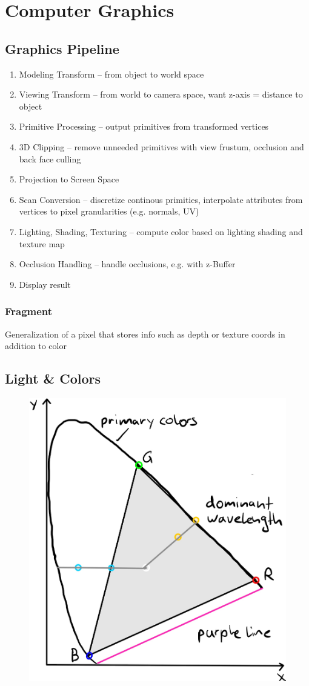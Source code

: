 \documentclass[a4paper,10pt]{article}
\begin{document}
\section{Computer Graphics}
\subsection{Graphics Pipeline}
\begin{enumerate}
    \item Modeling Transform -- from object to world space
    \item Viewing Transform -- from world to camera space, want z-axis = distance to object
    \item Primitive Processing -- output primitives from transformed vertices
    \item 3D Clipping -- remove unneeded primitives with view frustum, occlusion and back face culling
    \item Projection to Screen Space
    \item Scan Conversion -- discretize continous primities, interpolate attributes from vertices to pixel granularities (e.g. normals, UV)
    \item Lighting, Shading, Texturing -- compute color based on lighting shading and texture map
    \item Occlusion Handling -- handle occlusions, e.g. with z-Buffer
    \item Display result
\end{enumerate}

\subsubsection{Fragment} Generalization of a pixel that stores info such as depth or texture coords in addition to color

\subsection{Light \& Colors}

\begin{figure}[h]
    \centering
    \includegraphics[width=0.6\linewidth]{ciergb.jpeg}
\end{figure}
\end{document}
